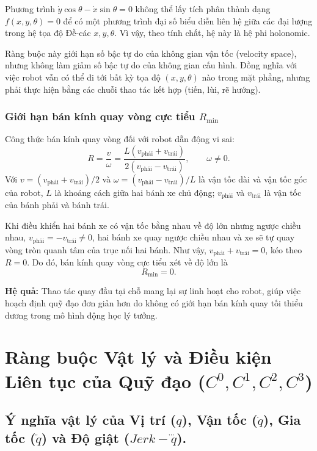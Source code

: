 \documentclass[12pt,a4paper,oneside]{report}
\begin{document}
Phương trình \(\dot{y}\cos\theta-\dot{x}\sin\theta=0\) không thể lấy tích phân thành dạng \(f(x,y,\theta)=0\) để có một phương trình đại số biểu diễn liên hệ giữa các đại lượng trong hệ tọa độ Đề-các \(x,y,\theta\). Vì vậy, theo tính chất, hệ này là hệ phi holonomic.

Ràng buộc này giới hạn số bậc tự do của không gian vận tốc (velocity space), nhưng không làm giảm số bậc tự do của không gian cấu hình. Đồng nghĩa với việc robot vẫn có thể đi tới bất kỳ tọa độ \((x,y,\theta)\) nào trong mặt phẳng, nhưng phải thực hiện bằng các chuỗi thao tác kết hợp (tiến, lùi, rẽ hướng).

\subsubsection{\texorpdfstring{Giới hạn bán kính quay vòng cực tiểu \(R_{\mathrm{min}}\)}{Giới hạn bán kính quay vòng cực tiểu Rmin}}

Công thức bán kính quay vòng đối với robot dẫn động vi sai:
\[
  R=\frac{v}{\omega}
   =\frac{L(v_{\text{phải}}+v_{\text{trái}})}
           {2(v_{\text{phải}}-v_{\text{trái}})},
  \qquad \omega\neq 0.
\]
Với \(v=(v_{\text{phải}}+v_{\text{trái}})/2\) và \(\omega=(v_{\text{phải}}-v_{\text{trái}})/L\) là vận tốc dài và vận tốc góc của robot, \(L\) là khoảng cách giữa hai bánh xe chủ động; \(v_{\text{phải}}\) và \(v_{\text{trái}}\) là vận tốc của bánh phải và bánh trái.

Khi điều khiển hai bánh xe có vận tốc bằng nhau về độ lớn nhưng ngược chiều nhau, \(v_{\text{phải}}=-v_{\text{trái}}\neq 0\), hai bánh xe quay ngược chiều nhau và xe sẽ tự quay vòng tròn quanh tâm của trục nối hai bánh. Như vậy, \(v_{\text{phải}}+v_{\text{trái}}=0\), kéo theo \(R=0\). Do đó, bán kính quay vòng cực tiểu xét về độ lớn là
\[
  R_{\mathrm{min}}=0.
\]

\textbf{Hệ quả:} Thao tác quay đầu tại chỗ mang lại sự linh hoạt cho robot, giúp việc hoạch định quỹ đạo đơn giản hơn do không có giới hạn bán kính quay tối thiểu dương trong mô hình động học lý tưởng.

\section{\texorpdfstring{Ràng buộc Vật lý và Điều kiện Liên tục của Quỹ đạo (\(C^{0},C^{1},C^{2},C^{3}\))}{Ràng buộc Vật lý và Điều kiện Liên tục của Quỹ đạo (C0,C1,C2,C3)}}

\subsection{\texorpdfstring{Ý nghĩa vật lý của Vị trí (\(q\)), Vận tốc (\(\dot{q}\)), Gia tốc (\(\ddot{q}\)) và Độ giật (\(Jerk-\dddot{q}\)).}{Ý nghĩa vật lý của Vị trí (q), Vận tốc (q), Gia tốc (q) và Độ giật (Jerk-q).}}
\end{document}
